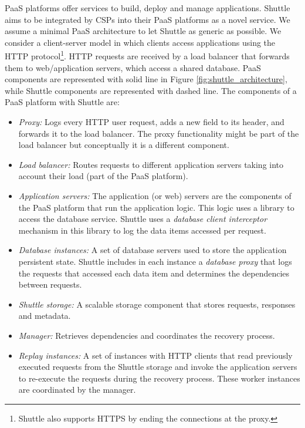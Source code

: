 \ac{PaaS} platforms offer services to build, deploy and manage applications. Shuttle aims to be integrated by CSPs into their \ac{PaaS} platforms as a novel service. 
We assume a minimal \ac{PaaS} architecture to let Shuttle as generic as possible. We consider a client-server model in which clients access applications using the HTTP protocol\footnote{Shuttle also supports HTTPS by ending the connections at the proxy.}. HTTP requests are received by a load balancer that forwards them to web/application servers, which access a shared database. {PaaS} components are represented with solid line in Figure \ref{fig:shuttle_architecture}, while Shuttle components are represented with dashed line. The components of a \ac{PaaS} platform with Shuttle are:

\begin{itemize}
  \item \textit{Proxy:} Logs every HTTP user request, adds a new field to its header, and forwards it to the load balancer. The proxy functionality might be part of the load balancer but conceptually it is a different component.%
  \item \textit{Load balancer:} Routes requests to different application servers taking into account their load (part of the \ac{PaaS} platform).
  \item \textit{Application servers:} The application (or web) servers are the components of the \ac{PaaS} platform that run the application logic. This logic uses a library to access the database service. Shuttle uses a \textit{database client interceptor} mechanism in this library to log the data items accessed per request.
  \item \textit{Database instances:} A set of database servers used to store the application persistent state. Shuttle includes in each instance  a \textit{database proxy} that logs the requests that accessed each data item and determines the dependencies between requests.
  \item \textit{Shuttle storage:} A scalable storage component that stores requests, responses and metadata.
  \item \textit{Manager:} Retrieves dependencies and coordinates the recovery process. 
  \item \textit{Replay instances:} A set of instances with HTTP clients that read previously executed requests from the Shuttle storage and invoke the application servers to re-execute the requests during the recovery process. These worker instances are coordinated by the manager.
\end{itemize}

